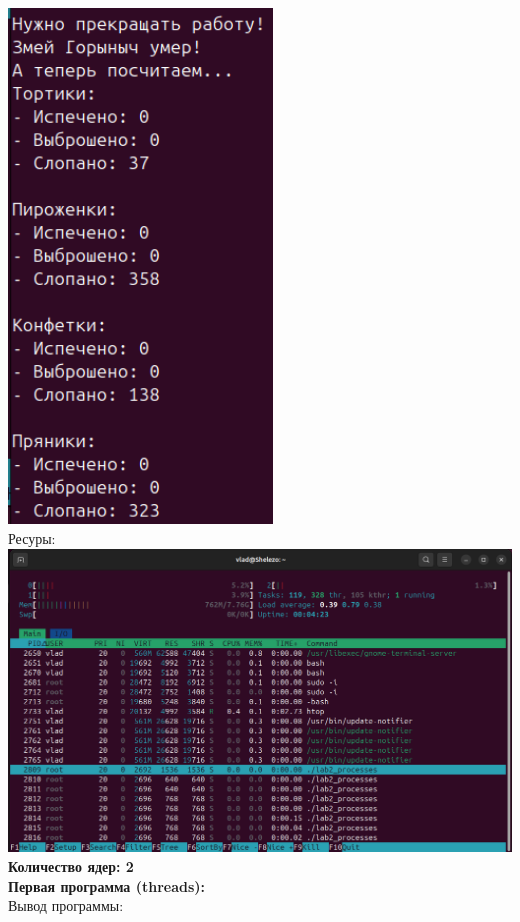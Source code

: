 \documentclass[a4paper,14pt]{extarticle}
\begin{document}
\includegraphics[width=70mm]{processes_output_3_7}\\
Ресуры:\\
\includegraphics[width=140mm]{processes_resources_3}\bigbreak
\textbf{Количество ядер: 2}\\
\textbf{Первая программа (threads):}\\
Вывод программы:\\
\end{document}
